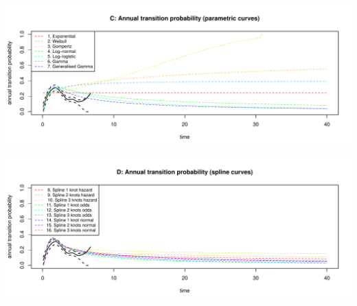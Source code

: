 \documentclass[]{article}
\begin{document}
\begin{flushleft}\includegraphics[height=0.29\textheight]{Images/validate_extrapolation3-3} \end{flushleft}

\begin{flushleft}\includegraphics[height=0.29\textheight]{Images/validate_extrapolation3-4} \end{flushleft}
\end{document}
